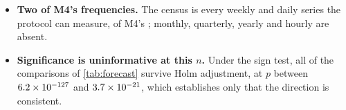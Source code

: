 \begin{itemize}
        error (sMAPE) of \LimPoolThreshold, the worst is \LimWorstPool\%.
  \item \textbf{Two of M4's \LimMfourFrequencies{} frequencies.} The census is
        every weekly and daily series the protocol can measure, \CensusSeries{} of
        M4's \LimMfourSeries{} \citep{makridakis2020m4}; monthly, quarterly,
        yearly and hourly are absent.
  \item \textbf{Significance is uninformative at this $n$.} Under the sign test,
        all \LimHolmSurvivors{} of the \LimHolmComparisons{} comparisons of
        \cref{tab:forecast} survive Holm adjustment, at $p$ between
        $6.2\times10^{-127}$ and $3.7\times10^{-21}$, which establishes only that the
        direction is consistent.
\end{itemize}

